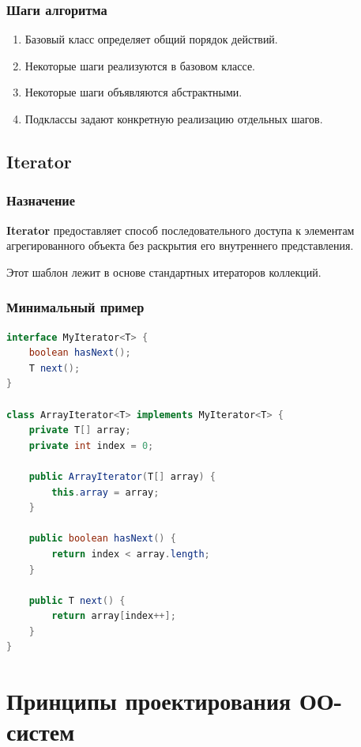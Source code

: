 \documentclass[12pt,a4paper]{article}
\begin{document}
\subsubsection{Шаги алгоритма}

\begin{enumerate}
    \item Базовый класс определяет общий порядок действий.
    \item Некоторые шаги реализуются в базовом классе.
    \item Некоторые шаги объявляются абстрактными.
    \item Подклассы задают конкретную реализацию отдельных шагов.
\end{enumerate}

\subsection{Iterator}

\subsubsection{Назначение}

\textbf{Iterator} предоставляет способ последовательного доступа к элементам агрегированного объекта без раскрытия его внутреннего представления.

Этот шаблон лежит в основе стандартных итераторов коллекций.

\subsubsection{Минимальный пример}

\begin{lstlisting}[language=Java,caption={Iterator}]
interface MyIterator<T> {
    boolean hasNext();
    T next();
}

class ArrayIterator<T> implements MyIterator<T> {
    private T[] array;
    private int index = 0;

    public ArrayIterator(T[] array) {
        this.array = array;
    }

    public boolean hasNext() {
        return index < array.length;
    }

    public T next() {
        return array[index++];
    }
}
\end{lstlisting}

\section{Принципы проектирования ОО-систем}
\end{document}
